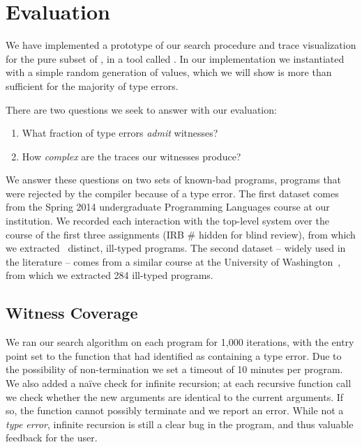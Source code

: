 \section{Evaluation}
\label{sec:evaluation}

%
%
We have implemented a prototype of our search procedure and trace
visualization for the pure subset of \ocaml, in a tool called \nanomaly.
%
In our implementation we instantiated \gensym with a simple random
generation of values, which we will show is more than sufficient for the
majority of type errors.

There are two questions we seek to answer with our evaluation:
\begin{enumerate}
\item What fraction of type errors \emph{admit} witnesses?
\item How \emph{complex} are the traces our witnesses produce?
\end{enumerate}

We answer these questions on two sets of known-bad programs, \ie
programs that were rejected by the \ocaml compiler because of a type
error.
%
The first dataset comes from the Spring 2014 undergraduate Programming
Languages course at our institution.
%
We recorded each interaction with the \ocaml top-level system over the
course of the first three assignments (IRB \# hidden for blind review), %
from which we extracted \ucsdsize\ distinct, ill-typed \ocaml programs.
%
The second dataset -- widely used in the literature -- comes from a
similar course at the University of
Washington~\cite{lerner_seminal:_2006}, from which we extracted 284
ill-typed programs.

\subsection{Witness Coverage}
\label{sec:eval:witness-coverage}
%
We ran our search algorithm on each program for 1,000 iterations, with
the entry point set to the function that \ocaml had identified as
containing a type error.
%
Due to the possibility of non-termination we set a timeout of 10 minutes
per program.
%
We also added a na\"ive check for infinite recursion; at each recursive
function call we check whether the new arguments are identical to the
current arguments.
%
If so, the function cannot possibly terminate and we report an error.
%
While not a \emph{type error}, infinite recursion is still a clear bug
in the program, and thus valuable feedback for the user.


